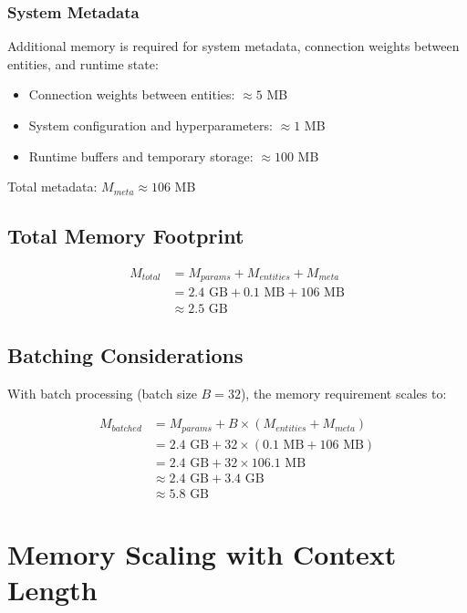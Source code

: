 \subsubsection{System Metadata}

Additional memory is required for system metadata, connection weights between entities, and runtime state:
\begin{itemize}
    \item Connection weights between entities: $\approx 5$ MB
    \item System configuration and hyperparameters: $\approx 1$ MB
    \item Runtime buffers and temporary storage: $\approx 100$ MB
\end{itemize}

Total metadata: $M_{meta} \approx 106$ MB

\subsection{Total Memory Footprint}

\begin{align}
M_{total} &= M_{params} + M_{entities} + M_{meta} \\
&= 2.4 \text{ GB} + 0.1 \text{ MB} + 106 \text{ MB} \\
&\approx 2.5 \text{ GB}
\end{align}

\subsection{Batching Considerations}

With batch processing (batch size $B = 32$), the memory requirement scales to:

\begin{align}
M_{batched} &= M_{params} + B \times (M_{entities} + M_{meta}) \\
&= 2.4 \text{ GB} + 32 \times (0.1 \text{ MB} + 106 \text{ MB}) \\
&= 2.4 \text{ GB} + 32 \times 106.1 \text{ MB} \\
&\approx 2.4 \text{ GB} + 3.4 \text{ GB} \\
&\approx 5.8 \text{ GB}
\end{align}

\section{Memory Scaling with Context Length}

